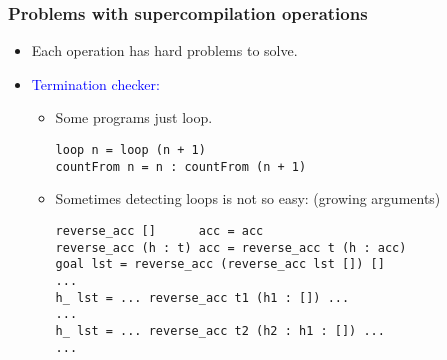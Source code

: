 \documentclass{beamer}
\begin{document}
\begin{frame}[fragile]
    \frametitle{Problems with supercompilation operations}

    \begin{itemize}[<+->]

        \item[]
            Each operation has hard problems to solve.

        \item[]
            \textcolor{blue}{Termination checker:}

            \begin{itemize}

                \item[]
                    Some programs just loop.

                    \begin{verbatim}
loop n = loop (n + 1)
countFrom n = n : countFrom (n + 1)
                    \end{verbatim}

                \item[]
                    Sometimes detecting loops is not so easy: (growing
                    arguments)

                    \begin{verbatim}
reverse_acc []      acc = acc
reverse_acc (h : t) acc = reverse_acc t (h : acc)
goal lst = reverse_acc (reverse_acc lst []) []
...
h_ lst = ... reverse_acc t1 (h1 : []) ...
...
h_ lst = ... reverse_acc t2 (h2 : h1 : []) ...
...
                    \end{verbatim}

            \end{itemize}

    \end{itemize}
\end{frame}
\end{document}
